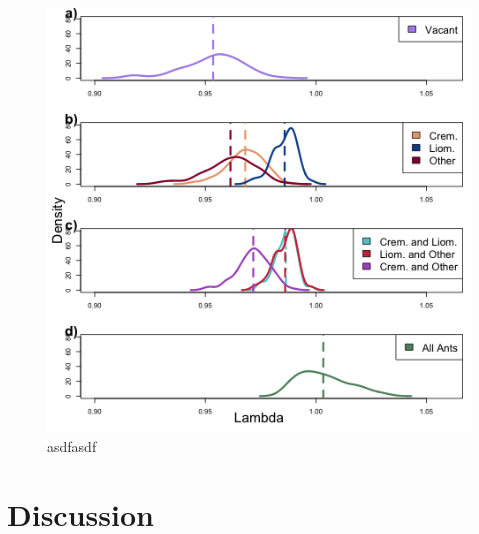 \documentclass[12pt,a4paper]{article}
\begin{document}
\begin{figure}[h]
	\includegraphics[width=\linewidth]{lambda_det_full.png}
	\caption{asdfasdf}
	\label{fig:lambda-det}
\end{figure}

\section*{Discussion}
\end{document}
